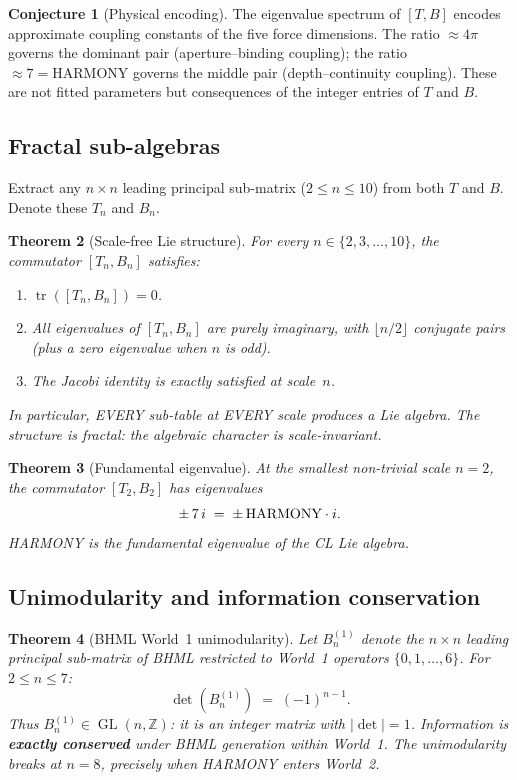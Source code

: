 \documentclass[11pt]{article}
\newtheorem{theorem}{Theorem}[section]
\theoremstyle{definition}
\newtheorem{conjecture}[theorem]{Conjecture}
\theoremstyle{remark}
\begin{document}
\begin{conjecture}[Physical encoding]
The eigenvalue spectrum of $[T,B]$ encodes approximate coupling constants of the
five force dimensions.  The ratio $\approx 4\pi$ governs the dominant pair
(aperture--binding coupling); the ratio $\approx 7 = \text{HARMONY}$ governs
the middle pair (depth--continuity coupling).  These are not fitted parameters
but consequences of the integer entries of $T$ and $B$.
\end{conjecture}

\subsection{Fractal sub-algebras}

Extract any $n\times n$ leading principal sub-matrix ($2\le n\le 10$) from both
$T$ and $B$.  Denote these $T_n$ and $B_n$.

\begin{theorem}[Scale-free Lie structure]
\label{thm:fractal}
For every $n \in \{2,3,\dots,10\}$, the commutator $[T_n, B_n]$ satisfies:
\begin{enumerate}[label=\textup{(\roman*)}]
  \item $\operatorname{tr}([T_n, B_n]) = 0$.
  \item All eigenvalues of $[T_n, B_n]$ are purely imaginary, with
        $\lfloor n/2 \rfloor$ conjugate pairs \textup{(}plus a zero eigenvalue
        when $n$ is odd\textup{)}.
  \item The Jacobi identity is exactly satisfied at scale~$n$.
\end{enumerate}
In particular, EVERY sub-table at EVERY scale produces a Lie algebra.
The structure is fractal: the algebraic character is scale-invariant.
\end{theorem}

\begin{theorem}[Fundamental eigenvalue]
\label{thm:fundamental}
At the smallest non-trivial scale $n=2$, the commutator $[T_2, B_2]$ has
eigenvalues
\[
  \pm\, 7\,i \;=\; \pm\,\textup{HARMONY}\cdot i.
\]
HARMONY is the fundamental eigenvalue of the CL Lie algebra.
\end{theorem}

\subsection{Unimodularity and information conservation}

\begin{theorem}[BHML World~1 unimodularity]
\label{thm:unimod}
Let $B_n^{(1)}$ denote the $n\times n$ leading principal sub-matrix of BHML
restricted to World~1 operators $\{0,1,\dots,6\}$.  For $2\le n\le 7$:
\[
  \det(B_n^{(1)}) \;=\; (-1)^{n-1}.
\]
Thus $B_n^{(1)} \in \operatorname{GL}(n,\mathbb{Z})$: it is an integer matrix
with $|\det|=1$.  Information is \textbf{exactly conserved} under BHML
generation within World~1.  The unimodularity breaks at $n=8$, precisely when
HARMONY enters World~2.
\end{theorem}
\end{document}
